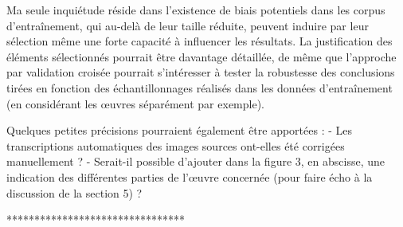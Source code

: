 Ma seule inquiétude réside dans l'existence de biais potentiels dans les corpus d'entraînement, qui au-delà de leur taille réduite, peuvent induire par leur sélection même une forte capacité à influencer les résultats. La justification des éléments sélectionnés pourrait être davantage détaillée, de même que l'approche par validation croisée pourrait s'intéresser à tester la robustesse des conclusions tirées en fonction des échantillonnages réalisés dans les données d'entraînement (en considérant les œuvres séparément par exemple).

Quelques petites précisions pourraient également être apportées :
- Les transcriptions automatiques des images sources ont-elles été corrigées manuellement ?
- Serait-il possible d'ajouter dans la figure 3, en abscisse, une indication des différentes parties de l'œuvre concernée (pour faire écho à la discussion de la section 5) ?



********************************